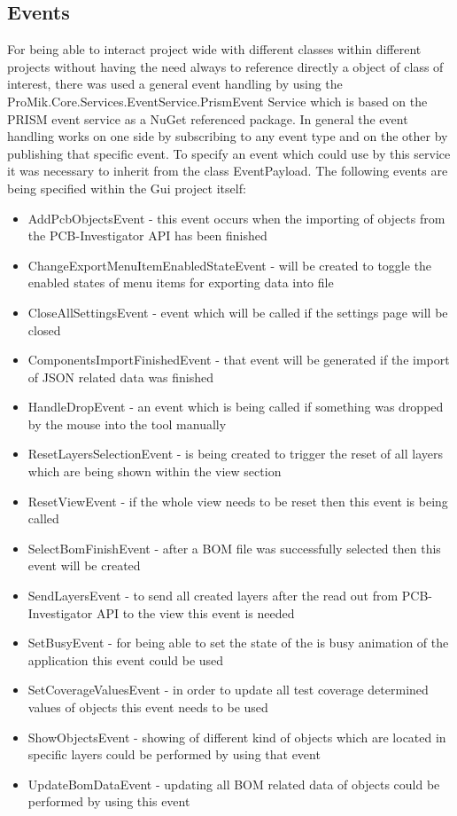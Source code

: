 		\subsection{Events}
For being able to interact project wide with different classes within different projects without having the need always to reference directly a object of class of interest, there was used a general event handling by using the ProMik.Core.Services.EventService.PrismEvent\linebreak
Service which is based on the PRISM event service as a NuGet referenced package. In general the event handling works on one side by subscribing to any event type and on the other by publishing that specific event. To specify an event which could use by this service it was necessary to inherit from the class EventPayload. The following events are being specified within the Gui project itself:
\begin{itemize}
	\item AddPcbObjectsEvent - this event occurs when the importing of objects from the \ac{PCB}-Investigator \ac{API} has been finished
	\item ChangeExportMenuItemEnabledStateEvent - will be created to toggle the enabled states of menu items for exporting data into file
	\item CloseAllSettingsEvent - event which will be called if the settings page will be closed
	\item ComponentsImportFinishedEvent - that event will be generated if the import of \ac{JSON} related data was finished
	\item HandleDropEvent - an event which is being called if something was dropped by the mouse into the tool manually
	\item ResetLayersSelectionEvent - is being created to trigger the reset of all layers which are being shown within the view section
	\item ResetViewEvent - if the whole view needs to be reset then this event is being called
	\item SelectBomFinishEvent - after a \ac{BOM} file was successfully selected then this event will be created
	\item SendLayersEvent - to send all created layers after the read out from \ac{PCB}-Investigator \ac{API} to the view this event is needed
	\item SetBusyEvent - for being able to set the state of the is busy animation of the application this event could be used
	\item SetCoverageValuesEvent - in order to update all test coverage determined values of objects this event needs to be used
	\item ShowObjectsEvent - showing of different kind of objects which are located in specific layers could be performed by using that event
	\item UpdateBomDataEvent - updating all \ac{BOM} related data of objects could be performed by using this event
\end{itemize}

